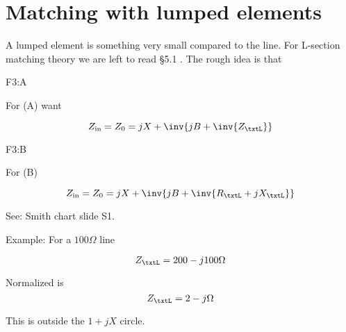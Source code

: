 \section{Matching with lumped elements}

A lumped element is something very small compared to the line.  For L-section matching theory we are left to read \S 5.1 \citep{pozar2009microwave}.  The rough idea is that

F3:A

For (A) want

\begin{equation}\label{eqn:uwavesDeck6LCmatchingCore:180}
Z_{\textrm{in}} = Z_0 = j X + \inv{ j B + \inv{Z_\txtL} }
\end{equation}

F3:B

For (B)

\begin{equation}\label{eqn:uwavesDeck6LCmatchingCore:200}
Z_{\textrm{in}} = Z_0 = j X + \inv{ j B + \inv{R_\txtL + j X_\txtL} }
\end{equation}

See: Smith chart slide S1.

Example: For a \( 100 \Omega \) line

\begin{equation}\label{eqn:uwavesDeck6LCmatchingCore:220}
Z_\txtL = 200 -j 100 \Omega
\end{equation}

Normalized is
\begin{equation}\label{eqn:uwavesDeck6LCmatchingCore:240}
Z_\txtL = 2 -j \Omega
\end{equation}

This is outside the \( 1 + j X \) circle.
